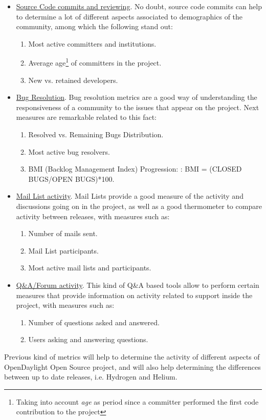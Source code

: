 \documentclass[a4paper, 12pt]{book}
\begin{document}
\begin{itemize}\itemsep0pt
\item{\underline{Source Code commits and reviewing}}. No doubt, source code commits can help to determine a lot of different aspects associated to demographics of the community, among which the following stand out:
\begin{enumerate}\itemsep0pt
\item{Most active committers and institutions}.
\item{Average age\footnote{Taking into account \emph{age} as period since a committer performed the first code contribution to the project} of committers in the project}.
\item{New vs. retained developers}.
\end{enumerate}
\item{\underline{Bug Resolution}}. Bug resolution metrics are a good way of understanding the responsiveness of a community to the issues that appear on the project. Next measures are remarkable related to this fact:
\begin{enumerate}\itemsep0pt
\item{Resolved vs. Remaining Bugs Distribution}.
\item{Most active bug resolvers}.
\item{BMI (Backlog Management Index) Progression: : BMI = (CLOSED BUGS/OPEN BUGS)*100}.
\end{enumerate}
\item{\underline{Mail List activity}}. Mail Lists provide a good measure of the activity and discussions going on in the project, as well as a good thermometer to compare activity between releases, with measures such as:
\begin{enumerate}\itemsep0pt
\item{Number of mails sent}.
\item{Mail List participants}.
\item{Most active mail lists and participants}.
\end{enumerate}
\item{\underline{Q\&A/Forum activity}}. This kind of Q\&A based tools allow to perform certain measures that provide information on activity related to support inside the project, with measures such as:
\begin{enumerate}\itemsep0pt
\item{Number of questions asked and answered}.
\item{Users asking and answering questions}.
\end{enumerate}
\end{itemize}
Previous kind of metrics will help to determine the activity of different aspects of OpenDaylight Open Source project, and will also help determining the differences between up to date releases, i.e. Hydrogen and Helium.
\end{document}
